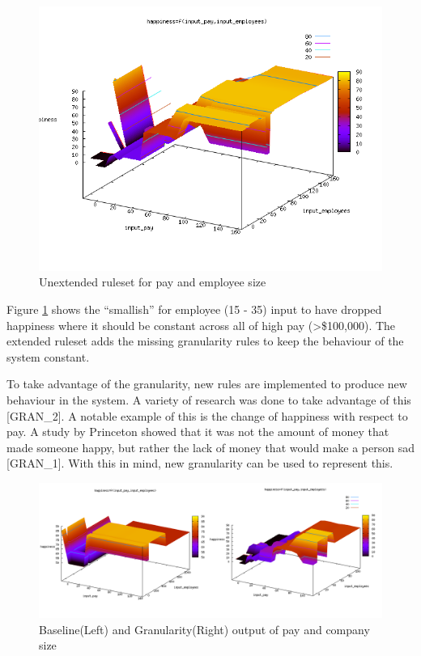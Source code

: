 \documentclass[12pt,fleqn,reqno,letterpaper]{article}
\begin{document}
\begin{figure}[H]
  \centering
  \includegraphics[scale=0.5,natwidth=650,natheight=501]{fig/extend_gran.png}
  \caption{Unextended ruleset for pay and employee size}
  \label{fig:EXTEND-GRAN}
\end{figure}
Figure \ref{fig:EXTEND-GRAN} shows the “smallish” for employee (15 - 35) input to have dropped happiness where it should be constant across all of high pay (>\$100,000).  The extended ruleset adds the missing granularity rules to keep the behaviour of the system constant.

To take advantage of the granularity, new rules are implemented to produce new behaviour in the system.  A variety of research was done to take advantage of this [GRAN\_2].  A notable example of this is the change of happiness with respect to pay.  A study by Princeton showed that it was not the amount of money that made someone happy, but rather the lack of money that would make a person sad [GRAN\_1].  With this in mind, new granularity can be used to represent this.

\begin{figure}[H]
  \centering
  \includegraphics[scale=0.5,natwidth=650,natheight=501]{fig/new_gran_rule.png}
  \caption{Baseline(Left) and Granularity(Right) output of pay and company size}
  \label{fig:NEW-GRAN-RULE}
\end{figure}
\end{document}
